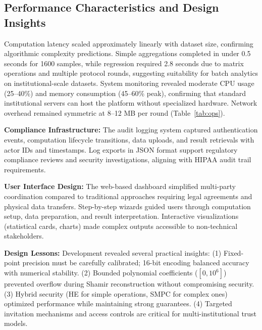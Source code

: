 \documentclass[conference]{IEEEtran}
\begin{document}
\subsection{Performance Characteristics and Design Insights}
Computation latency scaled approximately linearly with dataset size, confirming algorithmic complexity predictions. Simple aggregations completed in under 0.5 seconds for 1600 samples, while regression required 2.8 seconds due to matrix operations and multiple protocol rounds, suggesting suitability for batch analytics on institutional-scale datasets. System monitoring revealed moderate CPU usage (25–40\%) and memory consumption (45–60\% peak), confirming that standard institutional servers can host the platform without specialized hardware. Network overhead remained symmetric at 8–12 MB per round (Table~\ref{tab:ops}).

\textbf{Compliance Infrastructure:} The audit logging system captured authentication events, computation lifecycle transitions, data uploads, and result retrievals with actor IDs and timestamps. Log exports in JSON format support regulatory compliance reviews and security investigations, aligning with HIPAA audit trail requirements.

\textbf{User Interface Design:} The web-based dashboard simplified multi-party coordination compared to traditional approaches requiring legal agreements and physical data transfers. Step-by-step wizards guided users through computation setup, data preparation, and result interpretation. Interactive visualizations (statistical cards, charts) made complex outputs accessible to non-technical stakeholders.

\textbf{Design Lessons:} Development revealed several practical insights: (1) Fixed-point precision must be carefully calibrated; 16-bit encoding balanced accuracy with numerical stability. (2) Bounded polynomial coefficients ($[0, 10^6]$) prevented overflow during Shamir reconstruction without compromising security. (3) Hybrid security (HE for simple operations, SMPC for complex ones) optimized performance while maintaining strong guarantees. (4) Targeted invitation mechanisms and access controls are critical for multi-institutional trust models.
\end{document}
